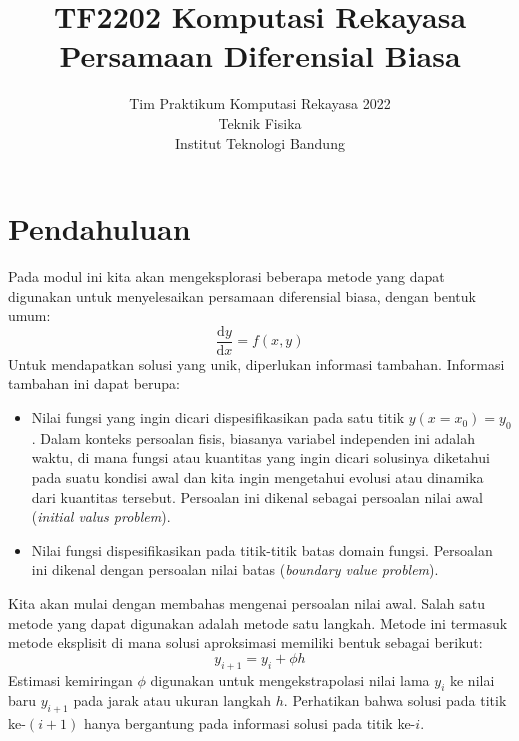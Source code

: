 



\title{%
{\small TF2202 Komputasi Rekayasa}\\
Persamaan Diferensial Biasa
}
\author{Tim Praktikum Komputasi Rekayasa 2022\\
Teknik Fisika\\
Institut Teknologi Bandung}
\date{}
\maketitle


\section*{Pendahuluan}
Pada modul ini kita akan mengeksplorasi beberapa metode yang
dapat digunakan untuk menyelesaikan persamaan diferensial biasa, dengan bentuk umum:
\begin{equation}
\frac{\mathrm{d}y}{\mathrm{d}x} = f(x,y)
\label{eq:dydx_umum}
\end{equation}
Untuk mendapatkan solusi yang unik, diperlukan informasi tambahan.
Informasi tambahan ini dapat berupa:
\begin{itemize}
\item Nilai fungsi yang ingin dicari dispesifikasikan pada satu titik $y(x=x_0)=y_0$.
Dalam konteks persoalan fisis, biasanya variabel independen ini adalah waktu, di mana
fungsi atau kuantitas yang ingin dicari solusinya diketahui pada suatu kondisi awal
dan kita ingin mengetahui evolusi atau dinamika dari kuantitas tersebut. Persoalan
ini dikenal sebagai persoalan nilai awal (\textit{initial valus problem}).
\item Nilai fungsi dispesifikasikan pada titik-titik batas domain fungsi.
Persoalan ini dikenal dengan persoalan nilai batas (\textit{boundary value problem}).
\end{itemize}

Kita akan mulai dengan membahas mengenai persoalan nilai awal. Salah satu metode yang
dapat digunakan adalah metode satu langkah. Metode ini termasuk metode eksplisit
di mana solusi aproksimasi memiliki bentuk sebagai berikut:
\begin{equation*}
y_{i+1} = y_{i} + \phi h
\end{equation*}
Estimasi kemiringan $\phi$ digunakan untuk mengekstrapolasi nilai lama
$y_{i}$ ke nilai baru $y_{i+1}$ pada jarak atau ukuran langkah $h$.
Perhatikan bahwa solusi pada titik ke-$(i+1)$ hanya bergantung pada informasi solusi
pada titik ke-$i$.


